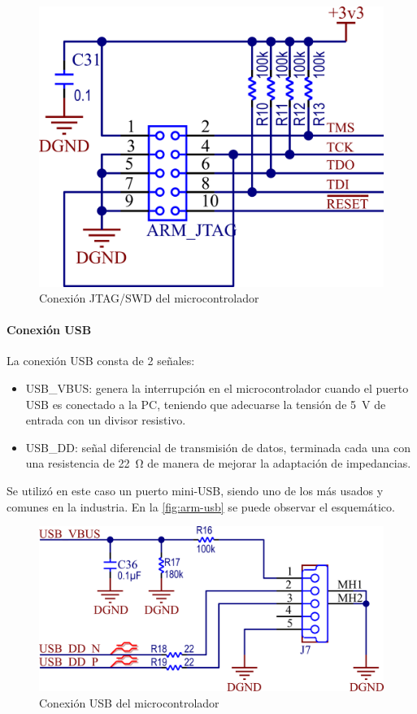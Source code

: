 \documentclass[titlepage, 12pt]{article}
\begin{document}
    \begin{figure}[!htbp]
        \centering
        \includegraphics[scale=1.5]{images/arm-jtag.png}
        \caption{Conexión JTAG/SWD del microcontrolador}
        \label{fig:arm-jtag}
    \end{figure}

\paragraph{Conexión USB}
La conexión USB consta de 2 señales:
    \begin{itemize}
        \item USB\_VBUS: genera la interrupción en el microcontrolador cuando el puerto USB es conectado a la PC, teniendo que adecuarse la tensión de \SI{5}{V} de entrada con un divisor resistivo.
        \item USB\_DD: señal diferencial de transmisión de datos, terminada cada una con una resistencia de \SI{22}{\ohm} de manera de mejorar la adaptación de impedancias.
    \end{itemize}

Se utilizó en este caso un puerto mini-USB, siendo uno de los más usados y comunes en la industria. En la \autoref{fig:arm-usb} se puede observar el esquemático.

    \begin{figure}[!htbp]
        \centering
        \includegraphics[scale=1.5]{images/arm-usb.png}
        \caption{Conexión USB del microcontrolador}
        \label{fig:arm-usb}
    \end{figure}
\end{document}
